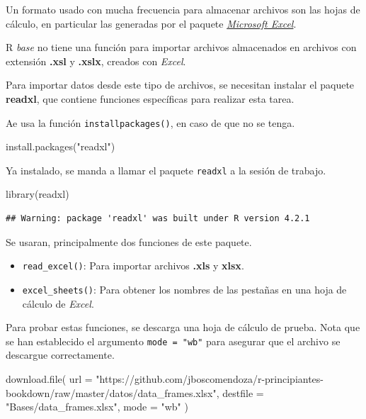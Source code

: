 \documentclass[
]{book}
\newenvironment{Shaded}{\begin{snugshade}}{\end{snugshade}}
\newcommand{\AttributeTok}[1]{\textcolor[rgb]{0.77,0.63,0.00}{#1}}
\newcommand{\FunctionTok}[1]{\textcolor[rgb]{0.00,0.00,0.00}{#1}}
\newcommand{\NormalTok}[1]{#1}
\newcommand{\StringTok}[1]{\textcolor[rgb]{0.31,0.60,0.02}{#1}}
\providecommand{\tightlist}{%
  \setlength{\itemsep}{0pt}\setlength{\parskip}{0pt}}
\begin{document}
Un formato usado con mucha frecuencia para almacenar archivos son las hojas de cálculo, en particular las generadas por el paquete \href{https://products.office.com/es-mx/excel}{\emph{Microsoft Excel}}.

R \emph{base} no tiene una función para importar archivos almacenados en archivos con extensión \textbf{.xsl} y \textbf{.xslx}, creados con \emph{Excel}.

Para importar datos desde este tipo de archivos, se necesitan instalar el paquete \textbf{readxl}, que contiene funciones específicas para realizar esta tarea.

Ae usa la función \texttt{installpackages()}, en caso de que no se tenga.

\begin{Shaded}
\begin{Highlighting}[]
\FunctionTok{install.packages}\NormalTok{(}\StringTok{"readxl"}\NormalTok{)}
\end{Highlighting}
\end{Shaded}

Ya instalado, se manda a llamar el paquete \texttt{readxl} a la sesión de trabajo.

\begin{Shaded}
\begin{Highlighting}[]
\FunctionTok{library}\NormalTok{(readxl)}
\end{Highlighting}
\end{Shaded}

\begin{verbatim}
## Warning: package 'readxl' was built under R version 4.2.1
\end{verbatim}

Se usaran, principalmente dos funciones de este paquete.

\begin{itemize}
\tightlist
\item
  \texttt{read\_excel()}: Para importar archivos \textbf{.xls} y \textbf{xlsx}.\\
\item
  \texttt{excel\_sheets()}: Para obtener los nombres de las pestañas en una hoja de cálculo de \emph{Excel}.
\end{itemize}

Para probar estas funciones, se descarga una hoja de cálculo de prueba. Nota que se han establecido el argumento \texttt{mode\ =\ "wb"} para asegurar que el archivo se descargue correctamente.

\begin{Shaded}
\begin{Highlighting}[]
\FunctionTok{download.file}\NormalTok{(}
  \AttributeTok{url =} \StringTok{"https://github.com/jboscomendoza/r{-}principiantes{-}bookdown/raw/master/datos/data\_frames.xlsx"}\NormalTok{, }
  \AttributeTok{destfile =} \StringTok{"Bases/data\_frames.xlsx"}\NormalTok{, }
  \AttributeTok{mode =} \StringTok{"wb"}
\NormalTok{) }
\end{Highlighting}
\end{Shaded}
\end{document}
